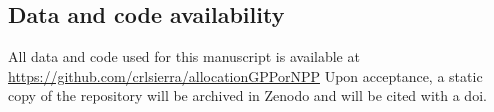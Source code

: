 \documentclass[12pt, a4paper]{article}
\begin{document}
\subsection*{Data and code availability}
All data and code used for this manuscript is available at \url{https://github.com/crlsierra/allocationGPPorNPP}
Upon acceptance, a static copy of the repository will be archived in Zenodo and will be cited with a doi. 




%
%
%
%
%
%
\end{document}
